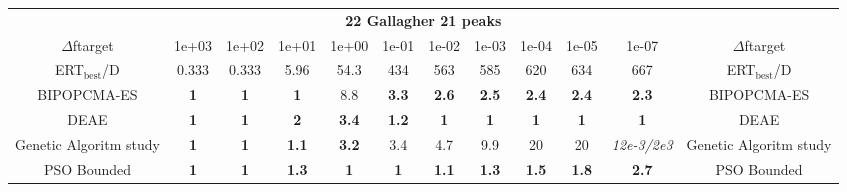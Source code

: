 \begin{tabular}{cccccccccccc}
 & \multicolumn{10}{c}{{\normalsize \textbf{22 Gallagher 21 peaks}}}\\
$\Delta$ftarget& 1e+03& 1e+02& 1e+01& 1e+00& 1e-01& 1e-02& 1e-03& 1e-04& 1e-05& 1e-07 & $\Delta$ftarget \\
ERT$_{\textrm{best}}$/D& 0.333& 0.333& 5.96& 54.3& 434& 563& 585& 620& 634& 667 & ERT$_{\textrm{best}}$/D \\
\hline
BIPOPCMA-ES & \textbf{1} & \textbf{1} & \textbf{1} & 8.8 & \textbf{3.3} & \textbf{2.6} & \textbf{2.5} & \textbf{2.4} & \textbf{2.4} & \textbf{2.3} & BIPOPCMA-ES \cite{add_an_entry_for_BIPOPCMA-ES_in_bbob.bib}\\
DEAE & \textbf{1} & \textbf{1} & \textbf{2} & \textbf{3.4} & \textbf{1.2} & \textbf{1} & \textbf{1} & \textbf{1} & \textbf{1} & \textbf{1} & DEAE \cite{add_an_entry_for_DEAE_in_bbob.bib}\\
Genetic Algoritm study & \textbf{1} & \textbf{1} & \textbf{1.1} & \textbf{3.2} & 3.4 & 4.7 & 9.9 & 20 & 20 & \textit{12e-3}\textit{/2e3} & Genetic Algoritm study \cite{add_an_entry_for_Genetic Algoritm study_in_bbob.bib}\\
PSO Bounded & \textbf{1} & \textbf{1} & \textbf{1.3} & \textbf{1} & \textbf{1} & \textbf{1.1} & \textbf{1.3} & \textbf{1.5} & \textbf{1.8} & \textbf{2.7} & PSO Bounded \cite{add_an_entry_for_PSO Bounded_in_bbob.bib}
\end{tabular}
